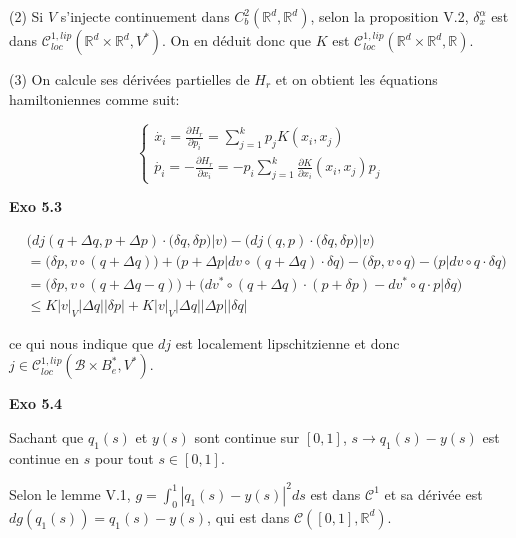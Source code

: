 \documentclass[11pt]{article}
\begin{document}
    (2) Si $V$ s'injecte continuement dans $C^2_b (\mathbb{R}^d, \mathbb{R}^d)$, selon la proposition V.2, $\delta_x^\alpha$ est dans 
    $\mathscr{C}_{loc}^{1,lip} (\mathbb{R}^d \times \mathbb{R}^d, V^*)$. On en déduit donc que $K$ est $\mathscr{C}_{loc}^{1,lip} (\mathbb{R}^d \times \mathbb{R}^d, \mathbb{R})$. 

    (3) On calcule ses dérivées partielles de $H_r$ et on obtient les équations hamiltoniennes comme suit:

    \vspace{-2em}
    $$
    \begin{cases} 
    \dot{x_i} = \frac{\partial H_r}{\partial p_i} = \sum_{j=1}^k p_j K(x_i, x_j)\\
    \dot{p_i} = -\frac{\partial H_r}{\partial x_i} = -p_i \sum_{j=1}^k \frac{\partial K}{\partial x_i} (x_i, x_j) p_j
    \end{cases}
    $$
    \vspace{-2em}

    \textbf{Exo 5.3} 

    \vspace{-5em}
    \begin{align*} 
      &\big(dj(q+\Delta q, p + \Delta p) \cdot \big(\delta q, \delta p \big) | v\big) -  \big(dj(q, p) \cdot \big(\delta q, \delta p \big) | v\big) \\ 
      &= \big(\delta p, v \circ (q + \Delta q) \big) + \big (p + \Delta p | dv \circ (q + \Delta q) \cdot \delta q \big ) - \big(\delta p, v \circ q \big) - \big (p | dv \circ q \cdot \delta q \big ) \\
      &= \big(\delta p, v \circ (q + \Delta q - q) \big) + \big (dv^* \circ (q + \Delta q) \cdot (p + \delta p) - dv^* \circ q \cdot p | \delta q \big ) \\
      &\le K |v|_V |\Delta q| |\delta p| + K |v|_V |\Delta q| |\Delta p| |\delta q|
    \end{align*}
    \vspace{-3em}

    ce qui nous indique que $dj$ est localement lipschitzienne et donc $j \in \mathscr{C}_{loc}^{1,lip} (\mathscr{B} \times B_e^*, V^*).$

    \textbf{Exo 5.4}

    Sachant que $q_1(s)$ et $y(s)$ sont continue sur $[0,1]$, $s \to q_1(s) - y(s)$ est continue en $s$ pour tout $s \in [0,1]$.

    Selon le lemme V.1, $g = \int_0^1 |q_1(s) - y(s)|^2 ds$ est dans $\mathscr{C}^1$ et sa dérivée est $dg(q_1(s)) = q_1(s) - y(s)$, qui est dans 
    $\mathscr{C} ([0, 1], \mathbb{R}^d)$.
\end{document}

